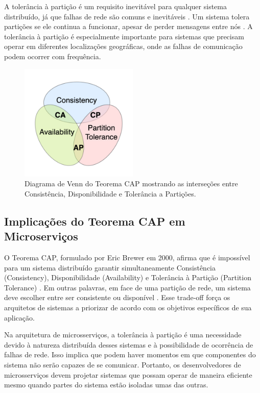 A tolerância à partição é um requisito inevitável para qualquer sistema distribuído, já que falhas de rede são comuns e inevitáveis \cite{brewer2000}. Um sistema tolera partições se ele continua a funcionar, apesar de perder mensagens entre nós \cite{brewer2000}. A tolerância à partição é especialmente importante para sistemas que precisam operar em diferentes localizações geográficas, onde as falhas de comunicação podem ocorrer com frequência.

\begin{figure}[h]
    \centering
    \includegraphics[width=0.5\textwidth]{figuras/CAP_Theorem_Venn_Diagram.png}
    \caption{Diagrama de Venn do Teorema CAP mostrando as interseções entre Consistência, Disponibilidade e Tolerância a Partições.}
    \label{fig:cap_theorem}
\end{figure}

\subsection{Implicações do Teorema CAP em Microserviços}

O Teorema CAP, formulado por Eric Brewer em 2000, afirma que é impossível para um sistema distribuído garantir simultaneamente Consistência (Consistency), Disponibilidade (Availability) e Tolerância à Partição (Partition Tolerance) \cite{brewer2000}. Em outras palavras, em face de uma partição de rede, um sistema deve escolher entre ser consistente ou disponível \cite{brewer2000}. Esse trade-off força os arquitetos de sistemas a priorizar de acordo com os objetivos específicos de sua aplicação.

Na arquitetura de microsserviços, a tolerância à partição é uma necessidade devido à natureza distribuída desses sistemas e à possibilidade de ocorrência de falhas de rede. Isso implica que podem haver momentos em que componentes do sistema não serão capazes de se comunicar. Portanto, os desenvolvedores de microsserviços devem projetar sistemas que possam operar de maneira eficiente mesmo quando partes do sistema estão isoladas umas das outras.

